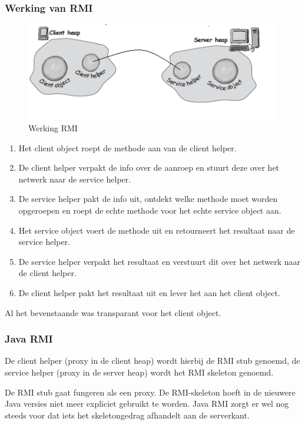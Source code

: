 \documentclass[a4paper,12pt]{article}
\begin{document}
\subsubsection{Werking van RMI}
\begin{figure}[H]
\centering
  	\includegraphics[width=.44\linewidth]{img/Proxy/RMIWerking.png}
  	\caption{Werking RMI}
  	\label{fig:RMIWerking}
\end{figure}
\begin{enumerate}
\item Het client object roept de methode aan van de client helper.
\item De client helper verpakt de info over de aanroep en stuurt deze over het netwerk naar de service helper.
\item De service helper pakt de info uit, ontdekt welke methode moet worden opgeroepen en roept de echte methode voor het echte service object aan.
\item Het service object voert de methode uit en retourneert het resultaat naar de service helper.
\item De service helper verpakt het resultaat en verstuurt dit over het netwerk naar de client helper.
\item De client helper pakt het resultaat uit en lever het aan het client object.
\end{enumerate}
Al het bevenstaande was transparant voor het client object.

\subsubsection{Java RMI}
De client helper (proxy in de client heap) wordt hierbij de RMI stub genoemd, de service helper (proxy in de server heap) wordt het RMI skeleton genoemd.

De RMI stub gaat fungeren als een proxy.
De RMI-skeleton hoeft in de nieuwere Java versies niet meer expliciet gebruikt te worden.
Java RMI zorgt er wel nog steeds voor dat iets het skeletongedrag afhandelt aan de serverkant.
\end{document}
